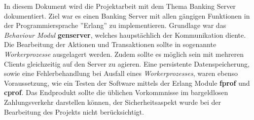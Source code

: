 In diesem Dokument wird die Projektarbeit mit dem Thema Banking Server dokumentiert. Ziel war es einen Banking Server mit allen gängigen Funktionen in der Programmiersprache ''Erlang'' zu implementieren. Grundlage war das \textit{Behaviour Modul} \textbf{gen\textunderscore server}, welches haupstächlich der Kommunikation diente. Die Bearbeitung der Aktionen und Transaktionen sollte in sogenannte \textit{Workerprozesse} ausgelagert werden. Zudem sollte es möglich sein mit mehreren Clients gleichzeitig auf den Server zu agieren. Eine persistente Datenspeicherung, sowie eine Fehlerbehandlung bei Ausfall eines \textit{Workerprozesses}, waren ebenso Voraussetzung, wie ein Testen der Software mittels der Erlang Module \textbf{fprof} und \textbf{cprof}. Das Endprodukt sollte die üblichen Vorkommnisse im bargeldlosen Zahlungsverkehr darstellen können, der Sicherheitsaspekt wurde bei der Bearbeitung des Projekts nicht berücksichtigt.